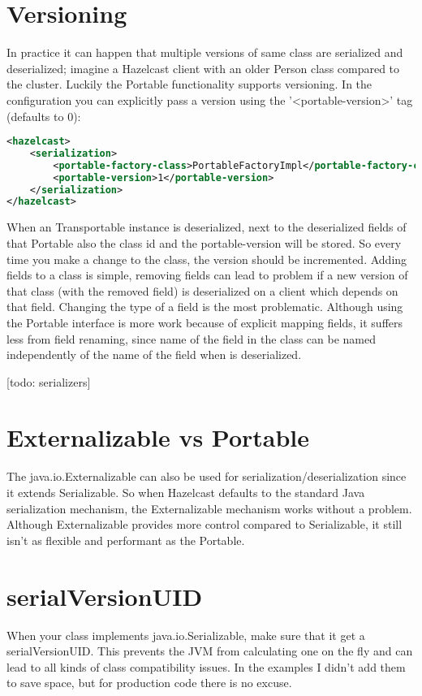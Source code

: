 \section{Versioning}
In practice it can happen that multiple versions of same class are serialized and deserialized; imagine a Hazelcast client with an older Person class compared to the cluster. Luckily the Portable functionality supports versioning. In the configuration you can explicitly pass a version using the '<portable-version>' tag (defaults to 0):
\begin{lstlisting}[language=xml]
<hazelcast>
    <serialization>
        <portable-factory-class>PortableFactoryImpl</portable-factory-class>
        <portable-version>1</portable-version>
    </serialization>
</hazelcast>
\end{lstlisting}
When an Transportable instance is deserialized, next to the deserialized fields of that Portable also the class id and the portable-version will be stored. So every time you make a change to the class, the version should be incremented. Adding fields to a class is simple, removing fields can lead to problem if a new version of that class (with the removed field) is deserialized on a client which depends on that field. Changing the type of a field is the most problematic. Although using the Portable interface is more work because of explicit mapping fields, it suffers less from field renaming, since name of the field in the class can be named independently of the name of the field when is deserialized.

[todo: serializers]


\section{Externalizable vs Portable}
The java.io.Externalizable can also be used for serialization/deserialization since it extends Serializable. So when Hazelcast defaults to the standard Java serialization mechanism, the Externalizable mechanism works without a problem. Although Externalizable provides more control compared to Serializable, it still isn't as flexible and performant as the Portable.

\section{serialVersionUID} 
When your class implements java.io.Serializable, make sure that it get a serialVersionUID. This prevents the JVM from calculating one on the fly and can lead to all kinds of class compatibility issues. In the examples I didn't add them to save space, but for production code there is no excuse.


